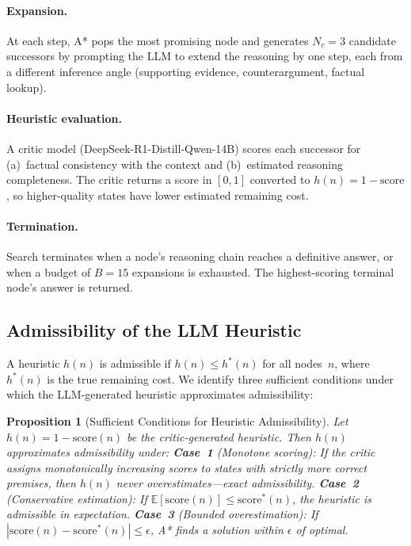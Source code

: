 \documentclass[11pt]{article}
\newtheorem{proposition}[theorem]{Proposition}
\begin{document}
\paragraph{Expansion.}
At each step, A* pops the most promising node and generates $N_c = 3$
candidate successors by prompting the LLM to extend the reasoning by one
step, each from a different inference angle (supporting evidence,
counterargument, factual lookup).

\paragraph{Heuristic evaluation.}
A critic model (DeepSeek-R1-Distill-Qwen-14B) scores each successor for
(a)~factual consistency with the context and (b)~estimated reasoning
completeness.  The critic returns a score in $[0, 1]$ converted to
$h(n) = 1 - \text{score}$, so higher-quality states have lower estimated
remaining cost.

\paragraph{Termination.}
Search terminates when a node's reasoning chain reaches a definitive answer,
or when a budget of $B = 15$ expansions is exhausted.  The
highest-scoring terminal node's answer is returned.

\subsection{Admissibility of the LLM Heuristic}
\label{sec:admissibility}

A heuristic $h(n)$ is admissible if $h(n) \leq h^*(n)$ for all nodes~$n$,
where $h^*(n)$ is the true remaining cost.  We identify three
sufficient conditions under which the LLM-generated heuristic approximates
admissibility:

\begin{proposition}[Sufficient Conditions for Heuristic Admissibility]
\label{prop:admissibility}
Let $h(n) = 1 - \mathrm{score}(n)$ be the critic-generated heuristic.
Then $h(n)$ approximates admissibility under:
\textbf{Case~1} (Monotone scoring): If the critic assigns monotonically
increasing scores to states with strictly more correct premises, then $h(n)$
never overestimates---exact admissibility.
\textbf{Case~2} (Conservative estimation): If
$\mathbb{E}[\mathrm{score}(n)] \leq \mathrm{score}^*(n)$, the heuristic is
admissible in expectation.
\textbf{Case~3} (Bounded overestimation): If
$|\mathrm{score}(n) - \mathrm{score}^*(n)| \leq \epsilon$, A* finds a
solution within $\epsilon$ of optimal.
\end{proposition}
\end{document}
